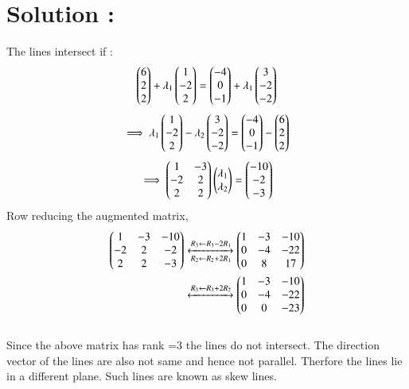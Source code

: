 \documentclass[journal,12pt,twocolumn]{IEEEtran}
\begin{document}
\section{Solution :}
The lines intersect if :
\begin{align}
	\begin{pmatrix}6\\2\\2\end{pmatrix} + \lambda_1\begin{pmatrix}1\\-2\\2\end{pmatrix} = \begin{pmatrix}-4\\0\\-1\end{pmatrix} + \lambda_1\begin{pmatrix}3\\-2\\-2\end{pmatrix} 
\end{align}
\begin{align}
	\implies
	\lambda_1\begin{pmatrix}1\\-2\\2\end{pmatrix} - \lambda_2\begin{pmatrix}3\\-2\\-2\end{pmatrix} = \begin{pmatrix}-4\\0\\-1\end{pmatrix} - \begin{pmatrix}6\\2\\2\end{pmatrix}
\end{align}
\begin{align}
        \implies
	\begin{pmatrix}1 & -3\\-2 & 2\\2 & 2\end{pmatrix}\begin{pmatrix}\lambda_1 \\ \lambda_2\end{pmatrix} = \begin{pmatrix}-10\\-2\\-3\end{pmatrix}
\end{align}
Row reducing the augmented matrix,
\begin{align}
	\begin{pmatrix}1  & -3 & -10 \\ -2 & 2 & -2 \\ 2 & 2 & -3\end{pmatrix} 
	\xleftrightarrow[R_2 \leftarrow R_2+2R_1]{R_3 \leftarrow R_3-2R_1}
	\begin{pmatrix}1  & -3 & -10 \\ 0 & -4 & -22 \\ 0 & 8 & 17\end{pmatrix}  \\
	\xleftrightarrow[]{R_3 \leftarrow R_3+2R_2}
	\begin{pmatrix}1  & -3 & -10 \\ 0 & -4 & -22 \\ 0 & 0 & -23\end{pmatrix} 
\end{align}
\\
Since the above matrix has rank =3 the lines do not intersect. The direction vector of the lines are also not same and hence not parallel. Therfore the lines lie in a different plane. Such lines are known as skew lines. \\
\end{document}
